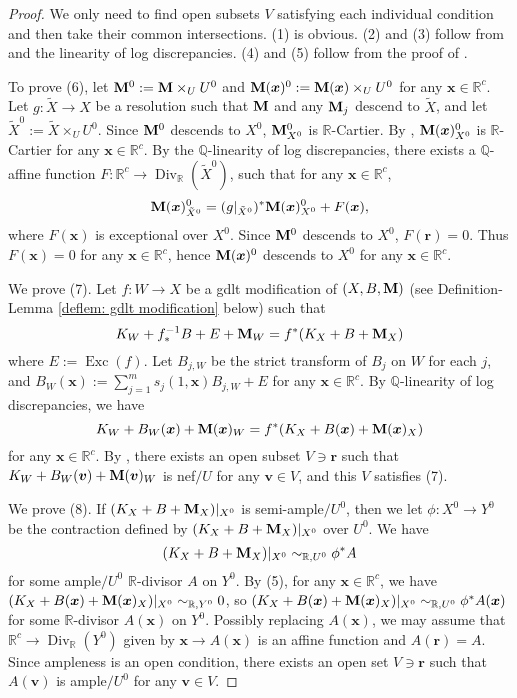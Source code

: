 \documentclass[11pt]{amsart}
\numberwithin{equation}{section}
\newcommand{\Mm}{{\bf{M}}}
\newcommand{\Qq}{\mathbb{Q}}
\newcommand{\Rr}{\mathbb{R}}
\newcommand{\Exc}{\operatorname{Exc}}
\newcommand{\Div}{\operatorname{Div}}
\theoremstyle{definition}
\theoremstyle{definition}
\theoremstyle{definition}
\begin{document}
\begin{proof}
We only need to find open subsets $V$ satisfying each individual condition and then take their common intersections. (1) is obvious. (2) and (3) follow from \cite[Theorem 1.4]{Che20} and the linearity of log discrepancies. (4) and (5) follow from the proof of \cite[Lemma 5.3]{HLS19}. 

To prove (6), let $\Mm^0:=\Mm\times_UU^0$ and $\Mm(\bm{x})^0:=\Mm(\bm{x})\times_UU^0$ for any $\bm{x}\in\mathbb R^c$. Let $g: \tilde X\rightarrow X$ be a resolution such that $\Mm$ and any $\Mm_j$ descend to $\tilde X$, and let $\tilde X^0:=\tilde X\times_UU^0$. Since $\Mm^0$ descends to $X^0$, $\Mm^0_{X^0}$ is $\Rr$-Cartier. By \cite[Lemma 5.3]{HLS19}, $\Mm(\bm{x})^0_{X^0}$ is $\Rr$-Cartier for any $\bm{x}\in\mathbb R^c$. By the $\Qq$-linearity of log discrepancies, there exists a $\Qq$-affine function $F: \mathbb R^c\rightarrow\Div_{\mathbb R}(\tilde X^0)$, such that for any $\bm{x}\in\mathbb R^c$,
$$\Mm(\bm{x})^0_{\tilde X^0}=(g|_{\tilde X^0})^*\Mm(\bm{x})^0_{X^0}+F(\bm{x}),$$
where $F(\bm{x})$ is exceptional over $X^0$. Since $\Mm^0$ descends to $X^0$, $F(\bm{r})=0$. Thus $F(\bm{x})=0$ for any $\bm{x}\in\mathbb R^c$, hence $\Mm(\bm{x})^0$ descends to $X^0$ for any $\bm{x}\in\mathbb R^c$. 


We prove (7). Let $f: W\rightarrow X$ be a gdlt modification of $(X,B,\Mm)$ (see Definition-Lemma \ref{deflem: gdlt modification} below) such that
$$K_W+f^{-1}_*B+E+\Mm_W=f^*(K_X+B+\Mm_X)$$
where $E:=\Exc(f)$. Let $B_{j,W}$ be the strict transform of $B_j$ on $W$ for each $j$, and $B_W(\bm{x}):=\sum_{j=1}^ms_j(1,\bm{x})B_{j,W}+E$ for any $\bm{x}\in\mathbb R^c$. By $\Qq$-linearity of log discrepancies, we have
$$K_W+B_W(\bm{x})+\Mm(\bm{x})_W=f^*(K_X+B(\bm{x})+\Mm(\bm{x})_X)$$
for any $\bm{x}\in\mathbb R^c$. By \cite[Proposition 3.16]{HL18}, there exists an open subset $V\ni\bm{r}$ such that $K_W+B_W(\bm{v})+\Mm(\bm{v})_W$ is nef$/U$ for any $\bm{v}\in V$, and this $V$ satisfies (7).

We prove (8). If $(K_X+B+\Mm_X)|_{X^0}$ is semi-ample$/U^0$, then we let $\phi: X^0\rightarrow Y^0$ be the contraction defined by $(K_X+B+\Mm_X)|_{X^0}$ over $U^0$. We have
$$(K_X+B+\Mm_X)|_{X^0}\sim_{\mathbb R,U^0}\phi^*A$$
for some ample$/U^0$ $\Rr$-divisor $A$ on $Y^0$. By (5), for any $\bm{x}\in\mathbb R^c$, we have $(K_X+B(\bm{x})+\Mm(\bm{x})_X)|_{X^0}\sim_{\mathbb R,Y^0}0$, so $(K_X+B(\bm{x})+\Mm(\bm{x})_X)|_{X^0}\sim_{\mathbb R,U^0}\phi^*A(\bm{x})$ for some $\Rr$-divisor $A(\bm{x})$ on $Y^0$. Possibly replacing $A(\bm{x})$, we may assume that $\mathbb R^c\rightarrow\Div_{\mathbb R}(Y^0)$ given by $\bm{x}\rightarrow A(\bm{x})$ is an affine function and $A(\bm{r})=A$. Since ampleness is an open condition, there exists an open set $V\ni\bm{r}$ such that $A(\bm{v})$ is ample$/U^0$ for any $\bm{v}\in V$. 


\end{proof}
\end{document}

